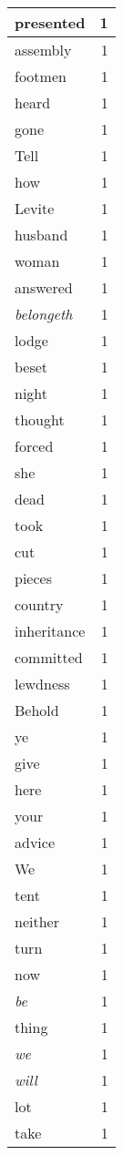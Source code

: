 \begin{center}
\begin{longtable}{l|r}
presented & 1 \\ \hline
assembly & 1 \\ \hline
footmen & 1 \\ \hline
heard & 1 \\ \hline
gone & 1 \\ \hline
Tell & 1 \\ \hline
how & 1 \\ \hline
Levite & 1 \\ \hline
husband & 1 \\ \hline
woman & 1 \\ \hline
answered & 1 \\ \hline
\emph{belongeth} & 1 \\ \hline
lodge & 1 \\ \hline
beset & 1 \\ \hline
night & 1 \\ \hline
thought & 1 \\ \hline
forced & 1 \\ \hline
she & 1 \\ \hline
dead & 1 \\ \hline
took & 1 \\ \hline
cut & 1 \\ \hline
pieces & 1 \\ \hline
country & 1 \\ \hline
inheritance & 1 \\ \hline
committed & 1 \\ \hline
lewdness & 1 \\ \hline
Behold & 1 \\ \hline
ye & 1 \\ \hline
give & 1 \\ \hline
here & 1 \\ \hline
your & 1 \\ \hline
advice & 1 \\ \hline
We & 1 \\ \hline
tent & 1 \\ \hline
neither & 1 \\ \hline
turn & 1 \\ \hline
now & 1 \\ \hline
\emph{be} & 1 \\ \hline
thing & 1 \\ \hline
\emph{we} & 1 \\ \hline
\emph{will} & 1 \\ \hline
lot & 1 \\ \hline
take & 1 \\ \hline

\end{longtable}
\end{center}
